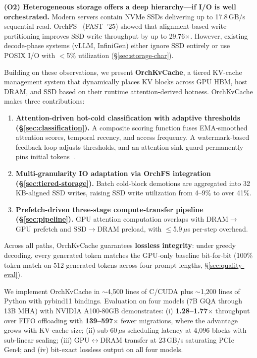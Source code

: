 \documentclass[conference]{IEEEtran}
\begin{document}
\textbf{(O2) Heterogeneous storage offers a deep hierarchy---if I/O is well orchestrated.} Modern servers contain NVMe SSDs delivering up to 17.8\,GB/s sequential read. OrchFS~\cite{orchfs} (FAST~'25) showed that alignment-based write partitioning improves SSD write throughput by up to 29.76$\times$. However, existing decode-phase systems (vLLM, InfiniGen) either ignore SSD entirely or use POSIX I/O with $<$5\% utilization (\S\ref{sec:storage-char}).

Building on these observations, we present \textbf{OrchKvCache}, a tiered KV-cache management system that dynamically places KV blocks across GPU HBM, host DRAM, and SSD based on their runtime attention-derived hotness. OrchKvCache makes three contributions:

\begin{enumerate}
\item \textbf{Attention-driven hot-cold classification with adaptive thresholds (\S\ref{sec:classification}).} A composite scoring function fuses EMA-smoothed attention scores, temporal recency, and access frequency. A watermark-based feedback loop adjusts thresholds, and an attention-sink guard permanently pins initial tokens~\cite{streamingllm}.

\item \textbf{Multi-granularity IO adaptation via OrchFS integration (\S\ref{sec:tiered-storage}).} Batch cold-block demotions are aggregated into 32\,KB-aligned SSD writes, raising SSD write utilization from 4--9\% to over 41\%.

\item \textbf{Prefetch-driven three-stage compute-transfer pipeline (\S\ref{sec:pipeline}).} GPU attention computation overlaps with DRAM$\to$GPU prefetch and SSD$\to$DRAM preload, with $\leq$5.9\,$\mu$s per-step overhead.
\end{enumerate}

Across all paths, OrchKvCache guarantees \textbf{lossless integrity}: under greedy decoding, every generated token matches the GPU-only baseline bit-for-bit (100\% token match on 512 generated tokens across four prompt lengths, \S\ref{sec:quality-eval}).

We implement OrchKvCache in ${\sim}$4,500 lines of C/CUDA plus ${\sim}$1,200 lines of Python with pybind11 bindings. Evaluation on four models (7B GQA through 13B MHA) with NVIDIA A100-80GB demonstrates: (i) \textbf{1.28--1.77$\times$} throughput over FIFO offloading with \textbf{139--597$\times$} fewer migrations, where the advantage grows with KV-cache size; (ii) sub-60\,$\mu$s scheduling latency at 4,096 blocks with sub-linear scaling; (iii) GPU$\leftrightarrow$DRAM transfer at 23\,GB/s saturating PCIe Gen4; and (iv) bit-exact lossless output on all four models.
\end{document}
